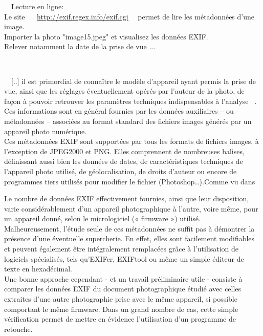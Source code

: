 \documentclass[10pt,fleqn]{article} %
\begin{document}
\RIGHTarrow ~~Lecture en ligne:\\
Le site ~~ \underline{{\url{http://exif.regex.info/exif.cgi}}} ~~permet de lire les métadonnées d'une image.\\
Importer la photo "image15.jpeg" et visualisez les données EXIF.\\

Relever notamment la date de la prise de vue ...

\begin{tcolorbox}[enhanced,title=\textit{Utilisation des métadonnées à des fins d'investigation},
	attach boxed title to top center=
	{yshift=-\tcboxedtitleheight/2},
	boxed title style={colback=black}]
	~~\\
	
	
	\begin{large}~~[..] il est primordial de connaître le modèle d’appareil ayant permis la prise de vue, ainsi que les réglages éventuellement opérés par l’auteur de la photo, de façon à pouvoir retrouver les paramètres techniques indispensables à l’analyse ~\cite{Mort}. Ces informations sont en général fournies par les données auxiliaires – ou métadonnées – associées au format standard des fichiers images générés par un appareil photo numérique.\\
		
		
		Ces métadonnées EXIF sont supportées par tous les formats de fichiers images, à l’exception de JPEG2000 et PNG. Elles comprennent de nombreuses balises, définissant aussi bien les données de dates, de caractéristiques techniques de l’appareil photo utilisé, de géolocalisation, de droits d’auteur ou encore de programmes tiers utilisés pour modifier le fichier (Photoshop…).Comme vu dans~\cite{Voyage}
		
		
		Le nombre de données EXIF effectivement fournies, ainsi que leur disposition, varie considérablement d’un appareil photographique à l’autre, voire même, pour un appareil donné, selon le micrologiciel (« firmware ») utilisé.\\
		
		
		Malheureusement, l’étude seule de ces métadonnées ne suffit pas à démontrer la présence d’une éventuelle supercherie. En effet, elles sont facilement modifiables et peuvent également être intégralement remplacées grâce à l’utilisation de logiciels spécialisés, tels qu’EXIFer, EXIFtool ou même un simple éditeur de texte en hexadécimal.\\
		
		
		Une bonne approche cependant - et un travail préliminaire utile - consiste à comparer les données EXIF du document photographique étudié avec celles extraites d’une autre photographie prise avec le même appareil, si possible comportant le même firmware. Dans un grand nombre de cas, cette simple vérification permet de mettre en évidence l’utilisation d’un programme de retouche.
		

\end{large}
\end{tcolorbox}
\end{document}
